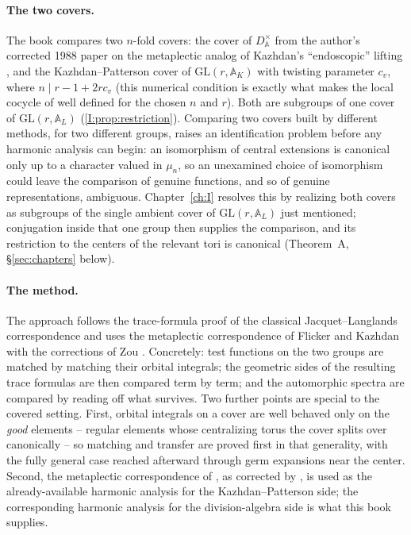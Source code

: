\documentclass[11pt,oneside]{book}
\theoremstyle{plain}
\theoremstyle{definition}
\begin{document}
\paragraph{The two covers.} The book compares two $n$-fold covers: the cover
of $D^\times_{\mathbb A}$ from the author's corrected 1988 paper on the
metaplectic analog of Kazhdan's ``endoscopic'' lifting \cite{JC26}, and
the Kazhdan--Patterson cover of $\mathrm{GL}(r,\mathbb A_K)$ with twisting
parameter $c_v$, where $n\mid r-1+2rc_v$ (this numerical condition is exactly what makes the local cocycle of \cite{KP84} well defined for the chosen $n$ and $r$).  Both are subgroups of one
cover of $\mathrm{GL}(r,\mathbb A_L)$ (\cref{I:prop:restriction}).  Comparing two covers built by different methods, for two different groups, raises an identification problem before any harmonic analysis can begin: an isomorphism of central extensions is canonical only up to a character valued in $\mu_n$, so an unexamined choice of isomorphism could leave the comparison of genuine functions, and so of genuine representations, ambiguous. Chapter~\ref{ch:I} resolves this by realizing both covers as subgroups of the single ambient cover of $\mathrm{GL}(r,\mathbb A_L)$ just mentioned; conjugation inside that one group then supplies the comparison, and its restriction to the centers of the relevant tori is canonical (Theorem~A, \S\ref{sec:chapters} below).

\paragraph{The method.} The
approach follows the trace-formula proof of the classical
Jacquet--Langlands correspondence and uses the metaplectic
correspondence of Flicker and Kazhdan \cite{FK86} with the corrections of
Zou \cite{Z23}. Concretely: test functions on the two groups are matched by matching their orbital integrals; the geometric sides of the resulting trace formulas are then compared term by term; and the automorphic spectra are compared by reading off what survives. Two further points are special to the covered setting. First, orbital integrals on a cover are well behaved only on the \emph{good} elements -- regular elements whose centralizing torus the cover splits over canonically -- so matching and transfer are proved first in that generality, with the fully general case reached afterward through germ expansions near the center. Second, the metaplectic correspondence of \cite{FK86}, as corrected by \cite{Z23}, is used as the already-available harmonic analysis for the Kazhdan--Patterson side; the corresponding harmonic analysis for the division-algebra side is what this book supplies.
\end{document}
